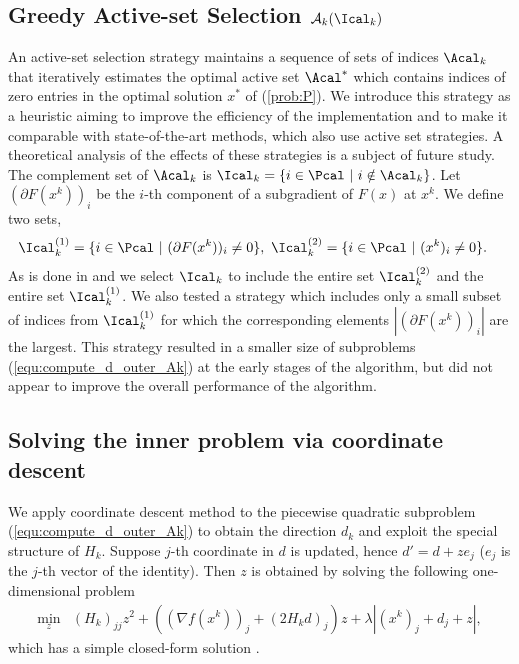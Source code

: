 \documentclass[11pt]{article}
\numberwithin{equation}{section}
\begin{document}

\subsection{Greedy Active-set Selection $\mathcal{A}_k(\Ical_k)$} %
\label{ssub:greedy_active_set_selection}
An active-set selection strategy maintains a sequence of sets of indices $\Acal_k$ that iteratively estimates the optimal active set $\Acal^*$ which contains indices of zero entries in the optimal solution $x^*$ of (\ref{prob:P}). We introduce this strategy as a heuristic aiming to improve the efficiency of the implementation and to make it comparable with state-of-the-art methods, which also use active set strategies. A theoretical analysis of the effects of these strategies is a subject of future study. 
The complement set of $\Acal_k$ is $\Ical_k = \{i \in \Pcal ~|~ i \notin \Acal_k\}$. 
Let $(\partial F(x^k))_i$ be the $i$-th component of a subgradient of $F(x)$ at $x^k$. We define two sets, 
\begin{align}
    \Ical^{(1)}_k &= \{i \in \Pcal ~|~(\partial F(x^k))_i \neq 0\}, \ \Ical^{(2)}_k = \{i \in \Pcal~|~ (x^k)_i \neq 0\}.
\end{align}
As is done in  \cite{nGLMNET} and \cite{Hsieh2011} we select $\Ical_k$ to include the entire set $\Ical^{(2)}_k$ and the entire set $\Ical^{(1)}_k$. We also  tested a strategy which  includes only  a small subset of  indices from $\Ical^{(1)}_k$ for which the corresponding elements $|(\partial F(x^k))_i|$    are the largest.  This strategy  resulted  in a smaller size of subproblems (\ref{equ:compute_d_outer_Ak}) at the early stages of the algorithm, but did not appear to improve the overall performance of the algorithm. 

 

\subsection{Solving the inner problem via coordinate descent}\label{sec:innerprob} %
\label{sub:the_algorithm}
We apply coordinate descent method to the  piecewise quadratic subproblem (\ref{equ:compute_d_outer_Ak}) to obtain the direction $d_k$ and exploit the special structure of $H_k$. 
Suppose $j$-th coordinate in $d$ is updated, hence $d' = d + ze_j$ ($e_j$ is the $j$-th vector of the identity). Then $z$ is obtained by solving the following one-dimensional problem
\begin{align}
    \label{equ:compute_z_prob}
    \nonumber\min_z  &(H_k)_{jj} z^2 + ( (\nabla f(x^k))_j + (2H_kd)_j  )z + \lambda | (x^k)_j + d_j + z |,
\end{align}
which has a simple closed-form solution \cite{Donoho92de-noisingby,Hsieh2011}. 
\end{document}
